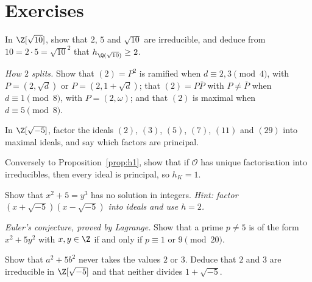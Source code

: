 \section{Exercises}

\begin{exercise}[$\star\star$]\label{ex:sqrt10}
In $\Z[\sqrt{10}]$, show that $2$, $5$ and $\sqrt{10}$ are irreducible, and deduce from $10=2\cdot5=\sqrt{10}^2$ that $h_{\Q(\sqrt{10})}\ge2$.
\end{exercise}

\begin{exercise}[$\star\star$]\label{ex:two}
\emph{How $2$ splits.} Show that $(2)=P^2$ is ramified when $d\equiv2,3\pmod4$, with $P=(2,\sqrt d)$ or $P=(2,1+\sqrt d)$; that $(2)=P\bar P$ with $P\ne\bar P$ when $d\equiv1\pmod8$, with $P=(2,\omega)$; and that $(2)$ is maximal when $d\equiv5\pmod8$.
\end{exercise}

\begin{exercise}[$\star\star$]\label{ex:factor5}
In $\Z[\sqrt{-5}]$, factor the ideals $(2)$, $(3)$, $(5)$, $(7)$, $(11)$ and $(29)$ into maximal ideals, and say which factors are principal.
\end{exercise}

\begin{exercise}[$\star\star$]\label{ex:ufdh1}
Conversely to Proposition~\ref{prop:h1}, show that if $\mathcal O$ has unique factorisation into irreducibles, then every ideal is principal, so $h_K=1$.
\end{exercise}

\begin{exercise}[$\star\star\star$]\label{ex:x2p5}
Show that $x^2+5=y^3$ has no solution in integers. \emph{Hint: factor $(x+\sqrt{-5})(x-\sqrt{-5})$ into ideals and use $h=2$.}
\end{exercise}

\begin{exercise}[$\star\star\star$]\label{ex:fermat5}
\emph{Euler's conjecture, proved by Lagrange.} Show that a prime $p\ne5$ is of the form $x^2+5y^2$ with $x,y\in\Z$ if and only if $p\equiv1$ or $9\pmod{20}$.
\end{exercise}

\begin{exercise}[$\star\star$]\label{ex:t1-no-norm}
Show that $a^2+5b^2$ never takes the values $2$ or $3$. Deduce that $2$ and $3$ are irreducible in $\Z[\sqrt{-5}]$ and that neither divides $1+\sqrt{-5}$.
\end{exercise}


